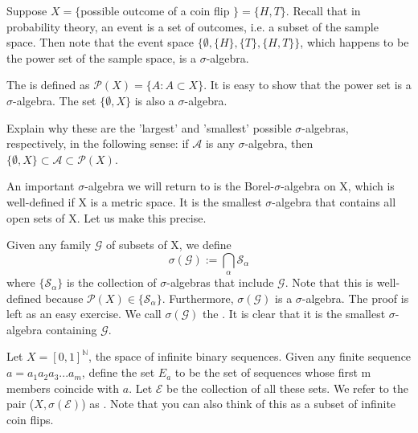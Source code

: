 \documentclass[11pt]{scrartcl}
\begin{document}
\begin{example}
Suppose $X = \{$possible outcome of a coin flip $\} = \{H,T\}$. Recall that in probability theory, an event is a set of outcomes, i.e. a subset of the sample space. Then note that the event space $ \{\emptyset,\{H\},\{T\},\{H,T\}\}$, which happens to be the power set of the sample space, is a $\sigma$-algebra.
\end{example}

\begin{example}
The  is defined as $\mathcal{P}(X) = \{A : A \subset X\}$. It is easy to show that the power set is a $\sigma$-algebra.
The set $\{\emptyset,X\}$ is also a $\sigma$-algebra. 

\end{example}

\begin{exercise}
Explain why these are the 'largest' and 'smallest' possible $\sigma$-algebras, respectively, in the following sense: if $\mathcal{A}$ is any $\sigma$-algebra, then $\{\emptyset,X\} \subset \mathcal{A} \subset \mathcal{P}(X)$.
\end{exercise}

An important $\sigma$-algebra we will return to is the Borel-$\sigma$-algebra on X, which is well-defined if X is a metric space. It is the smallest $\sigma$-algebra that contains all open sets of X. Let us make this precise.

\begin{definition}
Given any family $\mathcal{G}$ of subsets of X, we define
$$\sigma(\mathcal{G}) := \bigcap_\alpha \mathcal{S}_\alpha$$
where $\{\mathcal{S}_\alpha\}$ is the collection of $\sigma$-algebras that include $\mathcal{G}$. Note that this is well-defined because $\mathcal{P}(X) \in \{\mathcal{S}_\alpha\}$. Furthermore, $\sigma(\mathcal{G})$ is a $\sigma$-algebra. The proof is left as an easy exercise. We call $\sigma(\mathcal{G})$ the . It is clear that it is the smallest $\sigma$-algebra containing $\mathcal{G}$.
\end{definition}

\begin{example}
Let $X = [0,1]^\mathbb{N}$, the space of infinite binary sequences. Given any finite sequence $a = a_1a_2a_3...a_m$, define the set $E_a$ to be the set of sequences whose first m members coincide with $a$. Let $\mathcal{E}$ be the collection of all these sets. We refer to the pair ($X,\sigma(\mathcal{E})$) as .
Note that you can also think of this as a subset of infinite coin flips.
\end{example}
\end{document}

